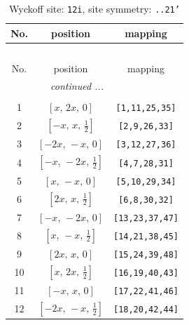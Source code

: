 \documentclass[fleqn,8pt]{jsarticle}
\begin{document}
\begin{longtable}{ccc}
\caption{Wyckoff site: {\tt 12i}, site symmetry: {\tt ..21'}}
 \\
 \hline \hline
No. & position & mapping \\ \hline \endfirsthead

\multicolumn{2}{l}{\tablename\ \thetable{}} \\
 \hline \hline
No. & position & mapping \\ \hline \endhead

 \hline \hline
\multicolumn{2}{r}{\footnotesize\it continued ...} \\ \endfoot

 \hline \hline
\multicolumn{2}{r}{} \\ \endlastfoot

1 & $\left[ x,\, 2 x,\, 0 \right]$ & {\tt [1,11,25,35]} \\ \hline
2 & $\left[ - x,\, x,\, \frac{1}{2} \right]$ & {\tt [2,9,26,33]} \\ \hline
3 & $\left[ - 2 x,\, - x,\, 0 \right]$ & {\tt [3,12,27,36]} \\ \hline
4 & $\left[ - x,\, - 2 x,\, \frac{1}{2} \right]$ & {\tt [4,7,28,31]} \\ \hline
5 & $\left[ x,\, - x,\, 0 \right]$ & {\tt [5,10,29,34]} \\ \hline
6 & $\left[ 2 x,\, x,\, \frac{1}{2} \right]$ & {\tt [6,8,30,32]} \\ \hline
7 & $\left[ - x,\, - 2 x,\, 0 \right]$ & {\tt [13,23,37,47]} \\ \hline
8 & $\left[ x,\, - x,\, \frac{1}{2} \right]$ & {\tt [14,21,38,45]} \\ \hline
9 & $\left[ 2 x,\, x,\, 0 \right]$ & {\tt [15,24,39,48]} \\ \hline
10 & $\left[ x,\, 2 x,\, \frac{1}{2} \right]$ & {\tt [16,19,40,43]} \\ \hline
11 & $\left[ - x,\, x,\, 0 \right]$ & {\tt [17,22,41,46]} \\ \hline
12 & $\left[ - 2 x,\, - x,\, \frac{1}{2} \right]$ & {\tt [18,20,42,44]} \\
\end{longtable}
\renewcommand{\arraystretch}{1.2}
\end{document}
